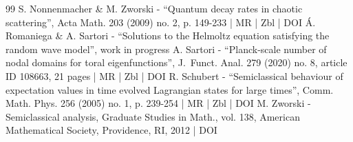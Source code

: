 \documentclass[10pt]{amsart}
\theoremstyle{plain}
\theoremstyle{definition}
\begin{document}
\begin{thebibliography}{99}
S. Nonnenmacher \& M. Zworski - “Quantum decay rates in chaotic scattering”, Acta Math. 203 (2009) no. 2, p. 149-233 | MR | Zbl | DOI
Á. Romaniega \& A. Sartori - “Solutions to the Helmoltz equation satisfying the random wave model”, work in progress
A. Sartori - “Planck-scale number of nodal domains for toral eigenfunctions”, J. Funct. Anal. 279 (2020) no. 8, article ID 108663, 21 pages | MR | Zbl | DOI
R. Schubert - “Semiclassical behaviour of expectation values in time evolved Lagrangian states for large times”, Comm. Math. Phys. 256 (2005) no. 1, p. 239-254 | MR | Zbl | DOI
M. Zworski - Semiclassical analysis, Graduate Studies in Math., vol. 138, American Mathematical Society, Providence, RI, 2012 | DOI
\end{thebibliography}
\end{document}

